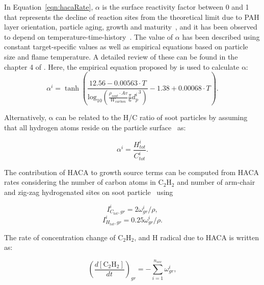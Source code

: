 In Equation~\eqref{eqn:hacaRate}, $\alpha$ is the surface reactivity factor between 0 and 1 that represents the decline of reaction sites from the theoretical limit due to PAH layer orientation, particle aging, growth and maturity~\citep{haynes1982surface, harris1985chemical}, and it has been observed to depend on temperature-time-history~\cite{homann1985formation, dasch1985decay}. The value of $\alpha$ has been described using constant target-specific values as well as empirical equations based on particle size and flame temperature. A detailed review of these can be found in the chapter 4 of \citep{veshkini2015understanding}.  Here, the empirical equation proposed by \citet{appel2000kinetic} is used to calculate $\mathrm{\alpha}$:
\begin{equation}
	\alpha^i = \tanh 
	\left(
	\frac{12.56 - 0.00563\cdot T}
	{\mbox{log}_{10}
		\left( \frac{\rho_{soot}\cdot Av}{W_{carbon}} \frac{\pi}{6}{d^i_p}^3 \right) } -1.38+0.00068\cdot T
	\right)
	\label{eqn:alpha}.
\end{equation}

Alternatively, $\mathrm{\alpha}$ can be related to the H/C ratio of soot particles by assuming that all hydrogen atoms reside on the particle surface~\citep{blanquart2009joint} as:

\begin{equation}
	\alpha^i = \frac{H^i_{tot}}{C^i_{tot}}
	\label{eqn:alpha_htoc}.
\end{equation}

The contribution of HACA to growth source terms can be computed from HACA rates considering the number of carbon atoms in $\mathrm{C_2H_2}$ and number of arm-chair and zig-zag hydrogenated sites on soot particle~\cite{blanquart2009analyzing} using

\begin{equation}
	I^i_{C_{tot},gr} = 2\omega^i_{gr}/\rho
	\label{eqn:IiCtotgr},
\end{equation}
\begin{equation}
	I^i_{H_{tot},gr} = 0.25\omega^i_{gr}/\rho
	\label{eqn:IiHtotgr}.
\end{equation}

The rate of concentration change of $\mathrm{C_2H_2}$, and H radical due to HACA is written as:

\begin{equation}
	\left(\frac{d\left[{\mathrm{C_2H_2}}\right]}{dt}\right)_{gr} = -\sum_{i=1}^{n_{sec}}\omega^i_{gr},
	\label{eqn:C2H2rate_gr}
\end{equation}

